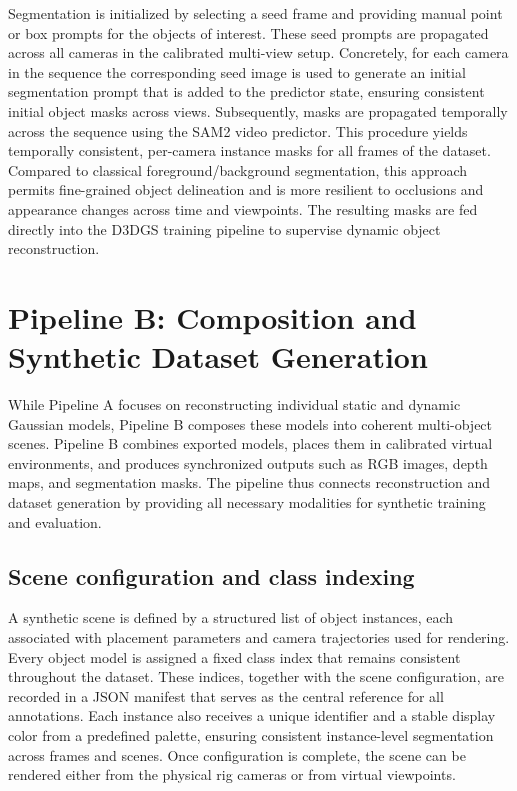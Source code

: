 Segmentation is initialized by selecting a seed frame and providing manual point or box prompts for the objects of interest. These seed prompts are propagated across all cameras in the calibrated multi-view setup. Concretely, for each camera in the sequence the corresponding seed image is used to generate an initial segmentation prompt that is added to the predictor state, ensuring consistent initial object masks across views. Subsequently, masks are propagated temporally across the sequence using the SAM2 video predictor. This procedure yields temporally consistent, per-camera instance masks for all frames of the dataset. Compared to classical foreground/background segmentation, this approach permits fine-grained object delineation and is more resilient to occlusions and appearance changes across time and viewpoints. The resulting masks are fed directly into the D3DGS training pipeline to supervise dynamic object reconstruction.


\section{Pipeline B: Composition and Synthetic Dataset Generation}

While Pipeline A focuses on reconstructing individual static and dynamic Gaussian models, Pipeline B composes these models into coherent multi-object scenes. Pipeline B combines exported models, places them in calibrated virtual environments, and produces synchronized outputs such as RGB images, depth maps, and segmentation masks. The pipeline thus connects reconstruction and dataset generation by providing all necessary modalities for synthetic training and evaluation.

\subsection{Scene configuration and class indexing}
A synthetic scene is defined by a structured list of object instances, each associated with placement parameters and camera trajectories used for rendering. Every object model is assigned a fixed class index that remains consistent throughout the dataset. These indices, together with the scene configuration, are recorded in a JSON manifest that serves as the central reference for all annotations. Each instance also receives a unique identifier and a stable display color from a predefined palette, ensuring consistent instance-level segmentation across frames and scenes. Once configuration is complete, the scene can be rendered either from the physical rig cameras or from virtual viewpoints.

